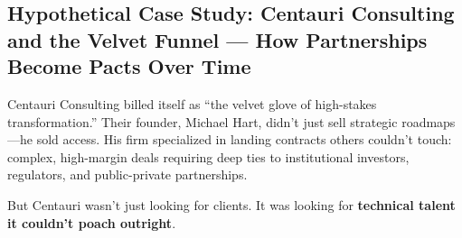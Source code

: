 \subsection{Hypothetical Case Study: Centauri Consulting and the Velvet Funnel — How Partnerships Become Pacts Over Time}

Centauri Consulting billed itself as “the velvet glove of high-stakes transformation.” Their founder, Michael Hart, didn’t just sell strategic roadmaps—he sold access. His firm specialized in landing contracts others couldn’t touch: complex, high-margin deals requiring deep ties to institutional investors, regulators, and public-private partnerships.

But Centauri wasn’t just looking for clients. It was looking for \textbf{technical talent it couldn’t poach outright}.

